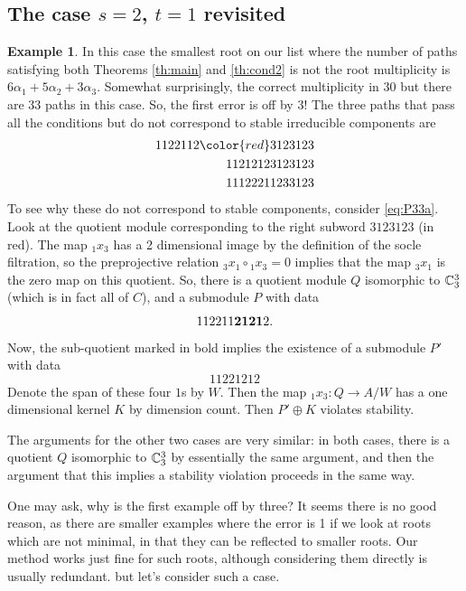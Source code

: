 \documentclass{amsart}
\numberwithin{equation}{section}
\numberwithin{figure}{section}
\numberwithin{table}{section}
\theoremstyle{definition}
\newtheorem{Example}[equation]{Example}
\begin{document}
\subsection{The case $s=2$, $t=1$ revisited}

\begin{Example} \label{ex:33}
In this case
the smallest root on our list where the number of paths satisfying both Theorems \ref{th:main} and \ref{th:cond2} is not the root multiplicity is $6 \alpha_1+5\alpha_2+3\alpha_3$. Somewhat surprisingly, the correct multiplicity in 30 but there are 33 paths in this case. So, the first error is off by 3! The three paths that pass all the conditions but do not correspond to stable irreducible components are
\begin{align}
\label{eq:P33a} 1122112{\color{red}3123123} \\
\label{eq:P33c} 11212123123123 \\
\label{eq:P33d} 11122211233123
\end{align}
To see why these do not correspond to stable components, consider \eqref{eq:P33a}. Look at the quotient module corresponding to the right subword $3123123$ (in red). The map ${}_1 x_3$ has a 2 dimensional image by the definition of the socle filtration, so the  preprojective relation ${}_3 x_1 \circ {}_1 x_3=0$ implies that the map ${}_3 x_1 $ is the zero map on this quotient. So, there is a quotient module $Q$ isomorphic to ${\Bbb C}_3^3$ (which is in fact all of $C$), and  a submodule $P$ with data
$$112211{\bf2121}2.$$
Now, the sub-quotient marked in bold implies the existence of a submodule $P'$ with data 
$$11221212$$
Denote the span of these four $1$s by $W$. Then
the map ${}_1 x_3: Q \rightarrow A/W$ has a one dimensional kernel $K$ by dimension count. Then 
$P'\oplus K$ violates stability. 

The arguments for the other two cases are very similar: in both cases, there is a quotient $Q$ isomorphic to ${\Bbb C}_3^3$ by essentially the same argument, and then the argument that this implies a stability violation proceeds in the same way. 

\end{Example}

One may ask, why is the first example off by three? It seems there is no good reason, as there are smaller examples where the error is 1 if we look at roots which are not minimal, in that they can be reflected to smaller roots. Our method works just fine for such roots, although considering them directly is usually redundant. but let's consider such a case. 
\end{document}

